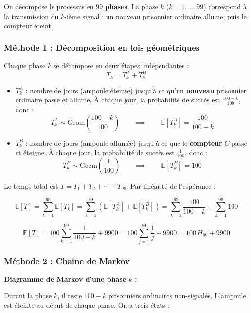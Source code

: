On décompose le processus en $99$ \textbf{phases}. La phase $k$ ($k = 1, \dots, 99$) correspond à la transmission du $k$-ième signal : un nouveau prisonnier ordinaire allume, puis le compteur éteint.


\bigskip

\subsubsection*{Méthode 1 : Décomposition en lois géométriques}

Chaque phase $k$ se décompose en deux étapes indépendantes :
\[
T_k = T_k^A + T_k^B
\]

\begin{itemize}
    \item $T_k^A$ : nombre de jours (ampoule éteinte) jusqu'à ce qu'un \textbf{nouveau} prisonnier ordinaire passe et allume. À chaque jour, la probabilité de succès est $\frac{100-k}{100}$, donc :
    \[
    T_k^A \sim \mathrm{Geom}\!\left(\frac{100-k}{100}\right) \qquad \implies \qquad \mathbb{E}[T_k^A] = \frac{100}{100-k}
    \]

    \item $T_k^B$ : nombre de jours (ampoule allumée) jusqu'à ce que le \textbf{compteur} $C$ passe et éteigne. À chaque jour, la probabilité de succès est $\frac{1}{100}$, donc :
    \[
    T_k^B \sim \mathrm{Geom}\!\left(\frac{1}{100}\right) \qquad \implies \qquad \mathbb{E}[T_k^B] = 100
    \]
\end{itemize}

Le temps total est $T = T_1 + T_2 + \cdots + T_{99}$. Par linéarité de l'espérance :

\[
\mathbb{E}[T] = \sum_{k=1}^{99} \mathbb{E}[T_k] = \sum_{k=1}^{99} \left(\mathbb{E}[T_k^A] + \mathbb{E}[T_k^B]\right) = \sum_{k=1}^{99} \frac{100}{100-k} + \sum_{k=1}^{99} 100
\]

\[
\mathbb{E}[T] = 100\sum_{k=1}^{99} \frac{1}{100-k} + 9900 = 100\sum_{j=1}^{99}\frac{1}{j} + 9900 = 100\,H_{99} + 9900
\]

\bigskip

\subsubsection*{Méthode 2 : Chaîne de Markov}



\bigskip

\textbf{Diagramme de Markov d'une phase $k$ :}

Durant la phase $k$, il reste $100 - k$ prisonniers ordinaires non-signalés. L'ampoule est éteinte au début de chaque phase. On a trois états :

